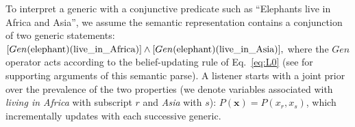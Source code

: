 \documentclass[10pt,letterpaper]{article}
\begin{document}
%
%
To interpret a generic with a conjunctive predicate such as ``Elephants live in Africa and Asia'', we assume the semantic representation contains a conjunction of two generic statements:
$
[Gen(\textnormal{elephant})( \textnormal{live\_in\_Africa})] \land
[Gen(\textnormal{elephant})( \textnormal{live\_in\_Asia})],
$
where the $Gen$ operator acts according to the belief-updating rule of Eq.~\ref{eq:L0} (see  for supporting arguments of this semantic parse).
A listener starts with a joint prior over the prevalence of the two properties (we denote variables associated with \emph{living in Africa} with subscript $r$ and \emph{Asia} with $s$): $P(\textbf{x}) = P(x_{r}, x_{s})$, which incrementally updates with each successive generic. 
\end{document}
